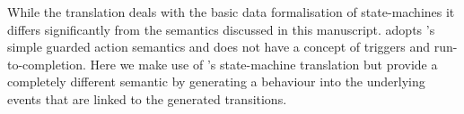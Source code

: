 While the \UMLB translation deals with the basic data formalisation of state-machines it differs 
significantly from the semantics discussed in this manuscript. 
\UMLB adopts \EventB's simple guarded action semantics and does not have a concept of triggers and run-to-completion.
Here we make use of \UMLB's state-machine translation but provide a completely different semantic by generating a behaviour into the underlying \EventB events that are linked to the generated \UMLB transitions.
